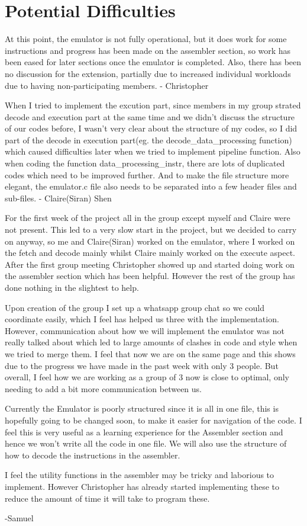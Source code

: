 \documentclass{article}
\begin{document}
\section*{Potential Difficulties}
At this point, the emulator is not fully operational, but it does work for some 
instructions and progress has been made on the assembler section, so work has 
been eased for later sections once the emulator is completed. Also, there has 
been no discussion for the extension, partially due to increased individual 
workloads due to having non-participating members. - Christopher
\newline

When I tried to implement the excution part, since members in my group strated 
decode and execution part at the same time and we didn't discuss the structure 
of our codes before, I wasn't very clear about the structure of my codes, so I 
did part of the decode in execution part(eg. the decode\_data\_processing function) 
which caused difficulties later when we tried to implement pipeline function. 
Also when coding the function data\_processing\_instr, there are lots of 
duplicated codes which need to be improved further. And to make the file 
structure more elegant, the emulator.c file also needs to be separated into a 
few header files and sub-files. - Claire(Siran) Shen
\newline

For the first week of the project all in the group except myself and Claire were 
not present. This led to a very slow start in the project, but we decided to 
carry on anyway, so me and Claire(Siran) worked on the emulator, where I worked 
on the fetch and decode mainly whilst Claire mainly worked on the execute 
aspect. After the first group meeting Christopher showed up and started 
doing work on the assembler section which has been helpful. However the rest of
the group has done nothing in the slightest to help. 

Upon creation of the group I set up a whatsapp group chat so we could coordinate
easily, which I feel has helped us three with the implementation. However,
communication about how we will implement the emulator was not really talked
about which led to large amounts of clashes in code and style when we tried to 
merge them. I feel that now we are on the same page and this shows due to the 
progress we have made in the past week with only 3 people. But overall, I feel 
how we are working as a group of 3 now is close to optimal, only needing to add
a bit more communication between us.

Currently the Emulator is poorly structured since it is all in one file, this 
is hopefully going to be changed soon, to make it easier for navigation of the 
code. I feel this is very useful as a learning experience for the Assembler
section and hence we won't write all the code in one file. We will also use the
structure of how to decode the instructions in the assembler.

I feel the utility functions in the assembler may be tricky and laborious to
implement. However Christopher has already started implementing these to reduce
the amount of time it will take to program these.

-Samuel
\end{document}
